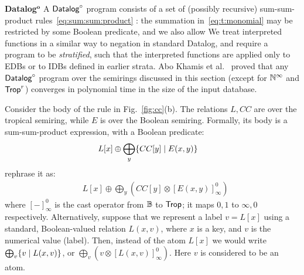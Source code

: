 {\bf Datalog$^{\mathbf{o}}$}  A $\text{\sf Datalog}^\circ$ program consists of a set of (possibly
recursive) sum-sum-product rules~\eqref{eq:sum:sum:product}
 : the summation
in~\eqref{eq:t:monomial} may be restricted by some Boolean predicate,
and we also allow 
We treat interpreted functions in a similar way to negation in
standard Datalog, and require a program to be {\em stratified}, such
that the interpreted functions are applied only to EDBs or to IDBs
defined in earlier strata.   Abo Khamis et
al.~\cite{khamis21:_conver_datal_pre_semir} proved that any $\text{\sf Datalog}^\circ$
program over the semirings discussed in this section (except for
$\mathbb N^\infty$ and $\text{\sf Trop}^r$) converges in polynomial time in the size of
the input database.

\begin{ex}
  Consider the body of the rule in Fig.~\ref{fig:cc}(b).
  The relations $L, CC$ are over the tropical semiring, while $E$ is
  over the Boolean semiring.  Formally, its body is a sum-sum-product
  expression, with a Boolean predicate:
%
  \begin{align*}
    & L[x] \oplus \bigoplus_y \{{CC[y]}\mid{E(x,y)}\}
  \end{align*}
%
   rephrase it as:
%
  \begin{align*}
    & L[x] \oplus \bigoplus_y \left(CC[y] \otimes [E(x,y)]_\infty^0\right)
  \end{align*}
%
  where $[-]_\infty^0$ is the cast operator from $\mathbb B$ to $\text{\sf Trop}$; it
  maps $0,1$ to $\infty,0$ respectively.  Alternatively, suppose that
  we represent a label $v=L[x]$ using a standard, Boolean-valued
  relation $L(x,v)$, where $x$ is a key, and $v$ is the numerical
  value (label).  Then, instead of the atom $L[x]$ we would write
  $\bigoplus_v \{{v}\mid{L(x,v)}\}$, or
  $\bigoplus_v \left(v \otimes [L(x,v)]_\infty^0\right)$.  Here $v$ is
  considered to be an atom.
\end{ex}

